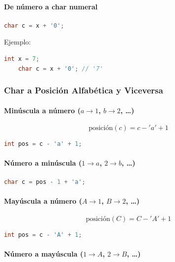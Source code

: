 \paragraph{De número a char numeral}

\begin{lstlisting}[language=C++]
	char c = x + '0';
\end{lstlisting}

Ejemplo:
\begin{lstlisting}[language=C++]
	int x = 7;
	char c = x + '0'; // '7'
\end{lstlisting}

\subsubsection{Char a Posición Alfabética y Viceversa}

\paragraph{Minúscula a número ($a \to 1$, $b \to 2$, \dots)}

\[
\text{posición}(c) = c - 'a' + 1
\]

\begin{lstlisting}[language=C++]
	int pos = c - 'a' + 1;
\end{lstlisting}

\paragraph{Número a minúscula ($1 \to a$, $2 \to b$, \dots)}

\begin{lstlisting}[language=C++]
	char c = pos - 1 + 'a';
\end{lstlisting}

\paragraph{Mayúscula a número ($A \to 1$, $B \to 2$, \dots)}

\[
\text{posición}(C) = C - 'A' + 1
\]

\begin{lstlisting}[language=C++]
	int pos = c - 'A' + 1;
\end{lstlisting}

\paragraph{Número a mayúscula ($1 \to A$, $2 \to B$, \dots)}

